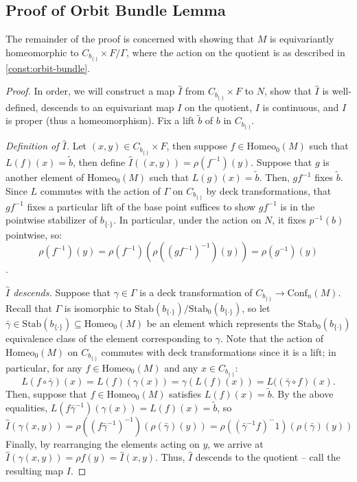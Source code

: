 \documentclass[10pt, oneside]{article}
\newcommand{\homeo}[1][S^1]{\text{Homeo}_0(#1)}
\newcommand{\conf}[2][S^1]{\text{Conf}_{#2}(#1)}
\newcommand{\set}{{\{\cdot\}}}
\newcommand{\stab}[1]{\text{Stab}(#1)}
\newcommand{\pstab}[1]{\text{Stab}_0(#1)}
\newcommand{\maxcov}{C_{b_\set}}
\theoremstyle{definition}
\theoremstyle{definition}
\begin{document}
\subsection{Proof of Orbit Bundle Lemma}\label{subsec:orbit-bundle-proof}
The remainder of the proof is concerned with showing that $M$  is equivariantly homeomorphic to $\maxcov\times F/\Gamma$, where the action on the quotient is as described in \cref{const:orbit-bundle}.

\begin{proof}
    In order, 
    we will construct a map $\hat{I}$ from $\maxcov \times F$ to $N$,
    show that $\hat{I}$ is well-defined,
    descends to an equivariant map $I$ on the quotient,
    $I$ is continuous, and
    $I$ is proper (thus a homeomorphism).
    Fix a lift $\tilde{b}$ of $b$ in $\maxcov$.
    
    \medskip
    {\it Definition of $\hat{I}$.} Let $(x, y)\in \maxcov\times F$, then
    suppose $f\in\homeo[M]$ such that $L(f)(x) = \tilde{b}$,
    then define $\hat{I}((x,y)) = \rho(f^{-1})(y)$. Suppose that $g$ is another element of $\homeo[M]$ such that $L(g)(x) = \tilde{b}$. Then, $gf^{-1}$ fixes $\tilde{b}$. Since $L$ commutes with the action of $\Gamma$ on $\maxcov$ by deck transformations, that $gf^{-1}$ fixes a particular lift of the base point suffices to show $gf^{-1}$ is in the pointwise stabilizer of $b_{\set}$. In particular, under the action on $N$, it fixes $p^{-1}(b)$ pointwise, so:
$$\rho(f^{-1})(y) = \rho(f^{-1})(\rho((gf^{-1})^{-1})(y)) = \rho(g^{-1})(y)$$.

    \medskip
    {\it $\hat{I}$ descends.} Suppose that $\gamma\in\Gamma$ is a deck transformation of $\maxcov\to \conf[M]{n}$. Recall that $\Gamma$ is isomorphic to $\stab{b_\set}/\pstab{b_\set}$, so let $\bar{\gamma}\in\stab{b_\set}\subseteq\homeo[M]$ be an element which represents the $\pstab{b_\set}$ equivalence class of the element corresponding to $\gamma$. Note that the action of $\homeo[M]$ on $\maxcov$ commutes with deck transformations since it is a lift; in particular, for any $f\in\homeo[M]$ and any $x\in\maxcov$:
    $$L(f\circ\bar{\gamma})(x) = L(f)(\gamma(x)) = \gamma(L(f)(x)) = L((\bar{\gamma}\circ f)(x).$$
    Then, suppose that $f\in\homeo[M]$ satisfies $L(f)(x) = \tilde{b}$. By the above equalities, $L(f\bar{\gamma}^{-1})(\gamma(x)) = L(f)(x) = \tilde{b}$, so $$\hat{I}(\gamma(x, y)) = \rho((f\bar{\gamma}^{-1})^{-1})(\rho(\bar{\gamma})(y)) = \rho((\bar{\gamma}^{-1}f)^-1)(\rho(\bar{\gamma})(y))$$
    Finally, by rearranging the elements acting on $y$, we arrive at $\hat{I}(\gamma(x,y)) = \rho{f}(y) = \hat{I}(x,y)$. Thus, $\hat{I}$ descends to the quotient -- call the resulting map $I$.
    

\end{proof}
\end{document}
